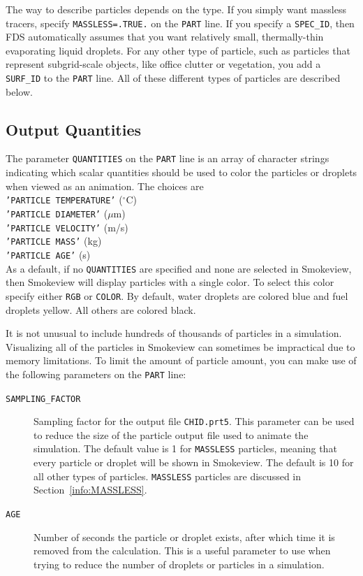 \documentclass[11pt]{book}
\newcommand{\ct}{\tt\small}
\begin{document}
The way to describe particles depends on the type.
If you simply want massless tracers, specify {\ct MASSLESS=.TRUE.} on the {\ct PART} line. If you specify a {\ct SPEC\_ID}, then FDS automatically assumes that you want relatively small, thermally-thin evaporating liquid droplets. For any other type of particle, such as particles that represent subgrid-scale objects, like office clutter or vegetation, you add a {\ct SURF\_ID} to the {\ct PART} line. All of these different types of particles are described below.


\subsection{Output Quantities}
\label{info:particle_quantities}

The parameter {\ct QUANTITIES} on the {\ct PART} line is an array of character strings indicating which
scalar quantities should be used to color the particles or droplets when viewed as an
animation. The choices are \\
{\ct 'PARTICLE TEMPERATURE'} ($^\circ$C) \\
{\ct 'PARTICLE DIAMETER'} ($\mu$m) \\
{\ct 'PARTICLE VELOCITY'} (m/s) \\
{\ct 'PARTICLE MASS'} (kg) \\
{\ct 'PARTICLE AGE'} (s) \\
As a default, if no {\ct QUANTITIES} are specified and none are selected in Smokeview, then
Smokeview will display particles with a single color.  To select this color specify either {\ct RGB} or
{\ct COLOR}. By default, water droplets are colored blue and fuel droplets yellow. All others are colored black.

It is not unusual to include hundreds of thousands of particles in a simulation. Visualizing all of the particles in Smokeview can sometimes be impractical due to memory limitations. To limit the amount of particle amount, you can make use of the following parameters on the {\ct PART} line:
\begin{description}
\item[{\ct SAMPLING\_FACTOR}]     Sampling factor for the output
file {\ct CHID.prt5}. This parameter can be used to reduce the size
of the particle output file used to animate the simulation. The default value is 1 for {\ct MASSLESS} particles, meaning that every particle or droplet will be shown in Smokeview.
The default is 10 for all other types of particles. {\ct MASSLESS} particles are discussed in Section~\ref{info:MASSLESS}.
\item[{\ct AGE}]  Number of seconds the particle or droplet exists, after which time it is removed from the calculation. This is a useful parameter to use when
trying to reduce the number of droplets or particles in a simulation.
\end{description}
\end{document}
